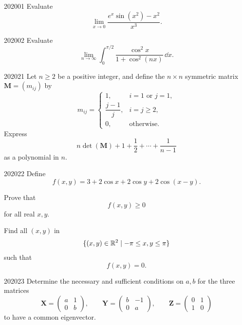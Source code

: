 
\begin{problem}{2020}{0}{1}
Evaluate
\[
    \lim_{x\to0}
    \frac{e^x\sin(x^2)-x^2}{x^3}.
\]
\end{problem}

\begin{problem}{2020}{0}{2}
Evaluate
\[
    \lim_{n\to\infty}
    \int_0^{\pi/2}
    \frac{\cos^2x}{1+\cos^2(nx)}\, \dd x.
\]
\end{problem}

\begin{problem}{2020}{2}{1}
Let $n\ge2$ be a positive integer, and define the $n\times n$ symmetric matrix $\mathbf M=(m_{ij})$ by
\[
    m_{ij}=
    \begin{cases}
        1, & i=1\text{ or }j=1, \\[0.2em]
        \dfrac{j-1}{j}, & i=j\ge2, \\[0.5em]
        0, & \text{otherwise}.
    \end{cases}
\]
Express
\[
    n\det(\mathbf M)+1+\frac12+\cdots+\frac{1}{n-1}
\]
as a polynomial in $n$.
\end{problem}

\begin{problem}{2020}{2}{2}
Define
\[
    f(x, y)=3+2\cos x+2\cos y+2\cos(x-y).
\]
\begin{problemsubparts}
    \item Prove that
    \[
        f(x, y)\ge0
    \]
    for all real $x, y$.
    \item Find all $(x, y)$ in
    \[
        \{(x, y)\in\mathbb{R}^2\mid -\pi\le x, y\le\pi\}
    \]
    such that
    \[
        f(x, y)=0.
    \]
\end{problemsubparts}
\end{problem}

\begin{problem}{2020}{2}{3}
Determine the necessary and sufficient conditions on $a, b$ for the three matrices
\[
    \mathbf X=
    \begin{pmatrix}
        a&1\\
        0&b
    \end{pmatrix},
    \qquad
    \mathbf Y=
    \begin{pmatrix}
        b&-1\\
        0&a
    \end{pmatrix},
    \qquad
    \mathbf Z=
    \begin{pmatrix}
        0&1\\
        1&0
    \end{pmatrix}
\]
to have a common eigenvector.
\end{problem}

